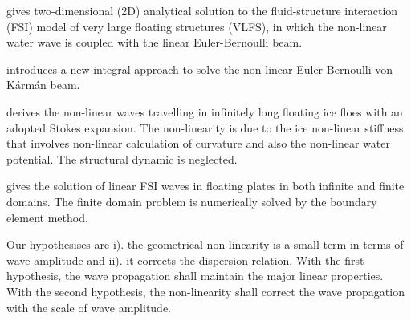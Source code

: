 \cite{Ma2020} gives two-dimensional (2D) analytical solution to the fluid-structure interaction (FSI) model of very large floating structures (VLFS), in which the non-linear water wave is coupled with the linear Euler-Bernoulli beam. 

\cite{Jang2013} introduces a new integral approach to solve the non-linear Euler-Bernoulli-von K\'{a}rm\'{a}n beam.

\cite{Vanden-Broeck2011} derives the non-linear waves travelling in infinitely long floating ice floes with an adopted Stokes expansion. The non-linearity is due to the ice non-linear stiffness that involves non-linear calculation of curvature and also the non-linear water potential. The structural dynamic is neglected. 

\cite{D.Wang2002} gives the solution of linear FSI waves in floating plates in both infinite and finite domains. The finite domain problem is numerically solved by the boundary element method.

Our hypothesises are i). the geometrical non-linearity is a small term in terms of wave amplitude and ii). it corrects the dispersion relation. With the first hypothesis, the wave propagation shall maintain the major linear properties. With the second hypothesis, the non-linearity shall correct the wave propagation with the scale of wave amplitude. 